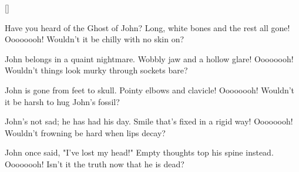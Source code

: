 []

\beginverse
Have you heard of the Ghost of John?
Long, white bones and the rest all gone!
Oooooooh!
Wouldn't it be chilly with no skin on?
\endverse

\beginverse
John belongs in a quaint nightmare.
Wobbly jaw and a hollow glare!
Oooooooh!
Wouldn't things look murky through sockets bare?
\endverse

\beginverse
John is gone from feet to skull.
Pointy elbows and clavicle!
Oooooooh!
Wouldn't it be harsh to hug John's fossil?
\endverse

\beginverse
John's not sad; he has had his day.
Smile that's fixed in a rigid way!
Oooooooh!
Wouldn't frowning be hard when lips decay?
\endverse

\beginverse
John once said, "I've lost my head!"
Empty thoughts top his spine instead.
Oooooooh!
Isn't it the truth now that he is dead?
\endverse

\endsong
